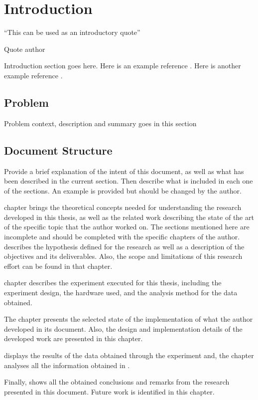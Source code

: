 \chapter{Introduction}
\label{chapter:introduction}


\epigraph{``This can be used as an introductory quote''}{Quote author}

\newpage

Introduction section goes here. Here is an example reference
\cite{examplereference}. Here is another example reference \cite{examplereference2}.

\newpage

\section{Problem}

Problem context, description and summary goes in this section

\section{Document Structure}

Provide a brief explanation of the intent of this document, as well as what has been described in the current section. Then describe what is included in each one of the sections. An example is provided but should be changed by the author.

 chapter brings the theoretical concepts needed for understanding the research developed in this thesis, as well as the related work describing the state of the art of the specific topic that the author worked on.
The sections mentioned here are incomplete and should be completed with the specific chapters of the author.
 describes the hypothesis defined for the research as well as a description of the objectives and its deliverables. Also, the scope and limitations of this research effort can be found in that chapter.

 chapter describes the experiment executed for this thesis, including the experiment design, the hardware used, and the analysis method for the data obtained.

The  chapter presents the selected state of the implementation of what the author developed in its document. Also, the design and implementation details of the developed work are presented in this chapter. 

 displays the results of the data obtained through the experiment and, the   chapter analyses all the information obtained in .

Finally,  shows all the obtained conclusions and remarks from the research presented in this document. Future work is identified in this chapter.





